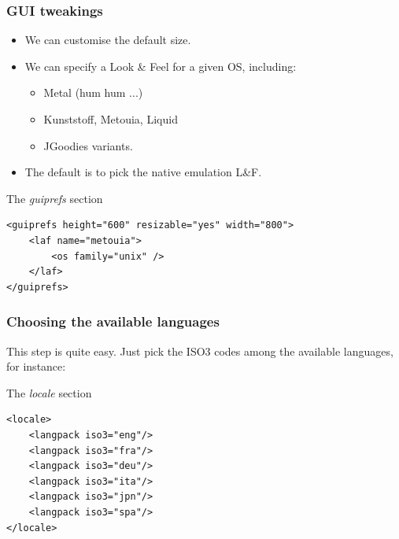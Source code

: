 \documentclass[compress,10pt]{beamer}
\begin{document}
\begin{frame}[containsverbatim]

\frametitle{GUI tweakings}

\begin{itemize}

  \item We can customise the default size.

  \item We can specify a Look \& Feel for a given OS, including:
    \begin{itemize}
      \item Metal (hum hum ...)
      \item Kunststoff, Metouia, Liquid
      \item JGoodies variants.
    \end{itemize}

  \item The default is to pick the native emulation L\&F.

\end{itemize}

\begin{block}{The \textsl{guiprefs} section}
\tiny
\begin{verbatim}
<guiprefs height="600" resizable="yes" width="800">
    <laf name="metouia">
        <os family="unix" />
    </laf>
</guiprefs>
\end{verbatim}
\end{block}

\end{frame}


\begin{frame}[containsverbatim]

\frametitle{Choosing the available languages}

This step is quite easy. Just pick the ISO3 codes among the available languages,
for instance:

\begin{block}{The \textsl{locale} section}
\tiny
\begin{verbatim}
<locale>
    <langpack iso3="eng"/>
    <langpack iso3="fra"/>
    <langpack iso3="deu"/>
    <langpack iso3="ita"/>
    <langpack iso3="jpn"/>
    <langpack iso3="spa"/>
</locale>
\end{verbatim}
\end{block}

\end{frame}
\end{document}
